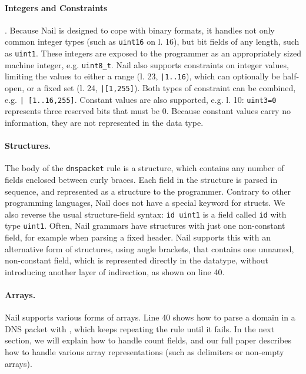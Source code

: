 \paragraph{Integers and Constraints}.
Because Nail is designed to cope with binary formats,
it handles not only common integer types (such as \texttt{uint16} on l. 16), but bit fields of any
length, such as \texttt{uint1}. These integers are exposed to the programmer as an appropriately
sized machine integer, e.g. \texttt{uint8\_t}. Nail also supports constraints on integer values,
limiting the values to either a range (l. 23, \texttt{|1..16}), which can optionally be half-open,
or a fixed set (l. 24, \texttt{|[1,255]}). Both types of constraint can be combined, e.g. \texttt{|
  [1..16,255]}. Constant values are also supported, e.g. l. 10: \texttt{uint3=0} represents
three reserved bits that must be 0. Because constant values carry no information, they are not
represented in the data type.

\paragraph{Structures.}

The body of the \texttt{dnspacket} rule is a structure, which contains any number of fields enclosed
between  curly braces. Each field in the structure is parsed in sequence, and represented as a
structure to the programmer.  Contrary to other programming languages, Nail does not have a special
keyword for structs. We also reverse the usual structure-field syntax: \texttt{id uint1} is a field
called \texttt{id} with type \texttt{uint1}. Often, Nail grammars have
structures with just one non-constant field, for example when parsing a fixed header. Nail supports
this with an alternative form of structures,
using angle brackets, that contains one unnamed, non-constant field, which is represented directly
in the datatype, without introducing another layer of indirection, as shown on line 40.


\paragraph{Arrays.}

Nail supports various forms of arrays. Line 40 shows how to parse a domain in a DNS packet with
, which keeps repeating the  rule until it fails.  In the next section, we will
explain how to handle count fields, and our full paper describes how to handle various array
representations (such as delimiters or non-empty arrays).


